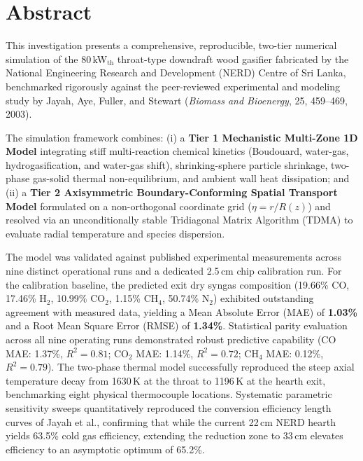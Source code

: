 \documentclass[11pt,a4paper]{article}
\begin{document}
\tableofcontents
\newpage
\listoffigures
\listoftables
\newpage
{}

\section{Abstract}
\noindent
This investigation presents a comprehensive, reproducible, two-tier numerical simulation of the 80\,kW$_{\text{th}}$ throat-type downdraft wood gasifier fabricated by the National Engineering Research and Development (NERD) Centre of Sri Lanka, benchmarked rigorously against the peer-reviewed experimental and modeling study by Jayah, Aye, Fuller, and Stewart (\textit{Biomass and Bioenergy}, 25, 459--469, 2003). 

The simulation framework combines: (i) a \textbf{Tier 1 Mechanistic Multi-Zone 1D Model} integrating stiff multi-reaction chemical kinetics (Boudouard, water-gas, hydrogasification, and water-gas shift), shrinking-sphere particle shrinkage, two-phase gas-solid thermal non-equilibrium, and ambient wall heat dissipation; and (ii) a \textbf{Tier 2 Axisymmetric Boundary-Conforming Spatial Transport Model} formulated on a non-orthogonal coordinate grid ($\eta = r/R(z)$) and resolved via an unconditionally stable Tridiagonal Matrix Algorithm (TDMA) to evaluate radial temperature and species dispersion.

The model was validated against published experimental measurements across nine distinct operational runs and a dedicated 2.5\,cm chip calibration run. For the calibration baseline, the predicted exit dry syngas composition (19.66\% CO, 17.46\% H$_2$, 10.99\% CO$_2$, 1.15\% CH$_4$, 50.74\% N$_2$) exhibited outstanding agreement with measured data, yielding a Mean Absolute Error (MAE) of \textbf{1.03\%} and a Root Mean Square Error (RMSE) of \textbf{1.34\%}. Statistical parity evaluation across all nine operating runs demonstrated robust predictive capability (CO MAE: 1.37\%, $R^2 = 0.81$; CO$_2$ MAE: 1.14\%, $R^2 = 0.72$; CH$_4$ MAE: 0.12\%, $R^2 = 0.79$). The two-phase thermal model successfully reproduced the steep axial temperature decay from 1630\,K at the throat to 1196\,K at the hearth exit, benchmarking eight physical thermocouple locations. Systematic parametric sensitivity sweeps quantitatively reproduced the conversion efficiency length curves of Jayah et al., confirming that while the current 22\,cm NERD hearth yields 63.5\% cold gas efficiency, extending the reduction zone to 33\,cm elevates efficiency to an asymptotic optimum of 65.2\%.
\end{document}
